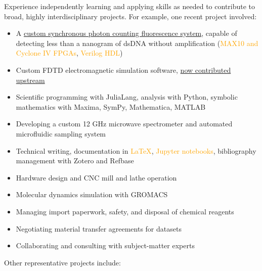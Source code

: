 \documentclass[fleqn,11pt]{article}
\newcommand{\sk}[1]{\textcolor{orange}{#1}}
\newcommand{\itemoptions}{\setlength{\itemindent}{-10pt} \setlength\itemsep{-1em}}
\begin{document}
Experience independently learning and applying skills as needed to contribute to broad, highly interdisciplinary projects. For example, one recent project involved:
\begin{itemize}\itemoptions
	\item A \href{https://github.com/0xDBFB7/fluorescence_photon_counting/releases/download/v0.01/fluorescence.pdf}{custom synchronous photon counting fluorescence system}, capable of detecting less than a nanogram of dsDNA without amplification (\sk{MAX10 and Cyclone IV FPGAs}, \sk{Verilog HDL})
	\item Custom FDTD electromagnetic simulation software, \href{https://github.com/flaport/fdtd/pull/27}{now contributed upstream} 
	\item Scientific programming with JuliaLang, analysis with Python, symbolic mathematics with Maxima, SymPy, Mathematica, MATLAB
	\item Developing a custom 12 GHz microwave spectrometer and automated microfluidic sampling system
	\item Technical writing, documentation in \sk{LaTeX}, \sk{Jupyter notebooks}, bibliography management with Zotero and Refbase
	\item Hardware design and CNC mill and lathe operation
	\item Molecular dynamics simulation with GROMACS
	\item Managing import paperwork, safety, and disposal of chemical reagents
	\item Negotiating material transfer agreements for datasets
	\item Collaborating and consulting with subject-matter experts
\end{itemize}

\pagebreak

Other representative projects include:

\end{document}

